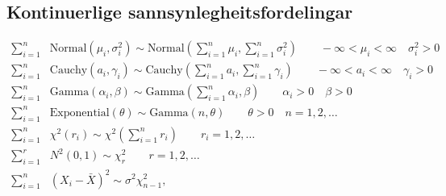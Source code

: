 \subsection{Kontinuerlige sannsynlegheitsfordelingar}
\begin{equation}
\begin{split}
\sum_{i=1}^n & \mathrm{Normal}(\mu_i,\sigma_i^2) \sim \mathrm{Normal}\left(\sum_{i=1}^n \mu_i, \sum_{i=1}^n \sigma_i^2\right) \qquad -\infty<\mu_i<\infty \quad \sigma_i^2>0 \\
\sum_{i=1}^n & \mathrm{Cauchy}(a_i,\gamma_i) \sim \mathrm{Cauchy}\left(\sum_{i=1}^n a_i, \sum_{i=1}^n \gamma_i\right) \qquad -\infty<a_i<\infty \quad \gamma_i>0  \\
\sum_{i=1}^n & \mathrm{Gamma}(\alpha_i,\beta) \sim \mathrm{Gamma}\left(\sum_{i=1}^n \alpha_i,\beta\right) \qquad \alpha_i>0  \quad \beta>0 \\
\sum_{i=1}^n & \mathrm{Exponential}(\theta) \sim \mathrm{Gamma}(n,\theta) \qquad \theta>0 \quad n=1,2,\dots \\
\sum_{i=1}^n & \chi^2(r_i) \sim \chi^2\left(\sum_{i=1}^n r_i\right) \qquad r_i=1,2,\dots \\
\sum_{i=1}^r & N^2(0,1) \sim \chi^2_r \qquad r=1,2,\dots \\
\sum_{i=1}^n & (X_i - \bar X)^2 \sim \sigma^2 \chi^2_{n-1}, \quad \\
\end{split}
\end{equation}